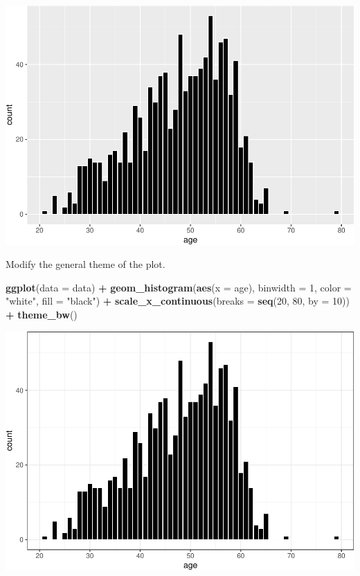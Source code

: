 \documentclass[
]{book}
\newenvironment{Shaded}{\begin{snugshade}}{\end{snugshade}}
\newcommand{\AttributeTok}[1]{\textcolor[rgb]{0.13,0.29,0.53}{#1}}
\newcommand{\DecValTok}[1]{\textcolor[rgb]{0.00,0.00,0.81}{#1}}
\newcommand{\FunctionTok}[1]{\textcolor[rgb]{0.13,0.29,0.53}{\textbf{#1}}}
\newcommand{\NormalTok}[1]{#1}
\newcommand{\SpecialCharTok}[1]{\textcolor[rgb]{0.81,0.36,0.00}{\textbf{#1}}}
\newcommand{\StringTok}[1]{\textcolor[rgb]{0.31,0.60,0.02}{#1}}
\begin{document}
\includegraphics{R-for-social-research-and-business-analytics_files/figure-latex/unnamed-chunk-20-1.pdf}

Modify the general theme of the plot.

\begin{Shaded}
\begin{Highlighting}[]
\FunctionTok{ggplot}\NormalTok{(}\AttributeTok{data =}\NormalTok{ data) }\SpecialCharTok{+}
  \FunctionTok{geom\_histogram}\NormalTok{(}\FunctionTok{aes}\NormalTok{(}\AttributeTok{x =}\NormalTok{ age), }\AttributeTok{binwidth =} \DecValTok{1}\NormalTok{,}
                 \AttributeTok{color =} \StringTok{"white"}\NormalTok{, }\AttributeTok{fill =} \StringTok{"black"}\NormalTok{) }\SpecialCharTok{+}
  \FunctionTok{scale\_x\_continuous}\NormalTok{(}\AttributeTok{breaks =} \FunctionTok{seq}\NormalTok{(}\DecValTok{20}\NormalTok{, }\DecValTok{80}\NormalTok{, }\AttributeTok{by =} \DecValTok{10}\NormalTok{)) }\SpecialCharTok{+}
  \FunctionTok{theme\_bw}\NormalTok{()}
\end{Highlighting}
\end{Shaded}

\includegraphics{R-for-social-research-and-business-analytics_files/figure-latex/unnamed-chunk-21-1.pdf}
\end{document}
